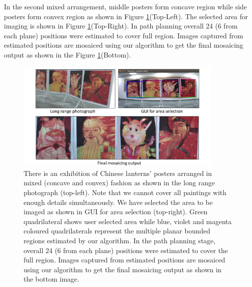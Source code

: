 In the second mixed arrangement, middle posters form concave region while
 side posters form convex region as shown in Figure
\ref{fig:resultMixed2}(Top-Left). The selected area for imaging is shown in
Figure \ref{fig:resultMixed2}(Top-Right).  In path planning overall 24 (6 from
each plane) positions were estimated to cover full region. Images captured from
estimated positions are mosaiced using our algorithm to get the final mosaicing
output as shown in the Figure \ref{fig:resultMixed2}(Bottom).
\begin{figure}
\centering
\includegraphics[width=0.9\textwidth]{figures/multiplanar/mixed2Result.pdf}
\caption[Result: Mixed arrangement]{There is an exhibition of Chinese lanterns'
posters arranged in mixed (concave and convex) fashion as shown in the long range photograph
(top-left). Note that we cannot cover all paintings with enough details
simultaneously. We have selected the area to be imaged as shown in GUI for
area selection (top-right). Green quadrilateral shows user selected area while
blue, violet and magenta coloured quadrilaterals represent the multiple
planar bounded regions estimated by our algorithm. In the path planning
stage, overall 24 (6 from each plane) positions were estimated to cover the full
region. Images captured from estimated positions are mosaiced using our
algorithm to get the final mosaicing output as shown in the bottom image.}
\label{fig:resultMixed2}
\end{figure}

